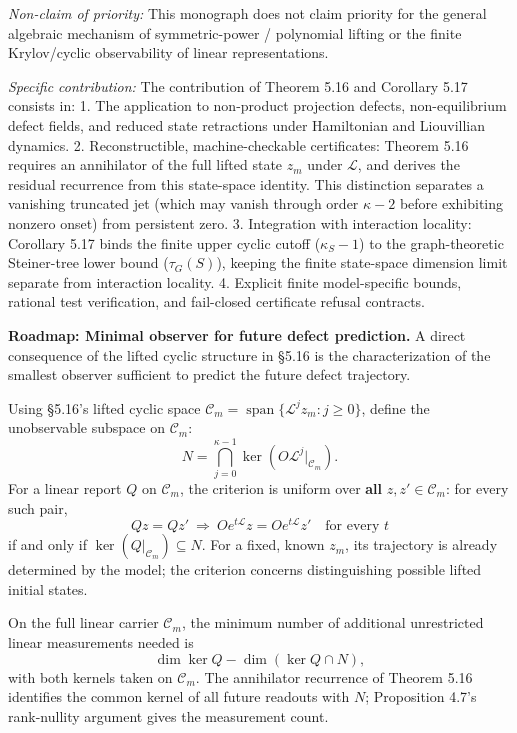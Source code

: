 \documentclass[
  11pt,
]{article}
\begin{document}
\emph{Non-claim of priority:} This monograph does not claim priority for the general
algebraic mechanism of symmetric-power / polynomial lifting or the finite
Krylov/cyclic observability of linear representations.

\emph{Specific contribution:} The contribution of Theorem 5.16 and Corollary 5.17
consists in:
1. The application to non-product projection defects, non-equilibrium defect
fields, and reduced state retractions under Hamiltonian and Liouvillian dynamics.
2. Reconstructible, machine-checkable certificates: Theorem 5.16 requires an
annihilator of the full lifted state \(z_m\) under \(\mathcal L\), and derives the
residual recurrence from this state-space identity. This distinction separates
a vanishing truncated jet (which may vanish through order \(\kappa-2\) before
exhibiting nonzero onset) from persistent zero.
3. Integration with interaction locality: Corollary 5.17 binds the finite upper
cyclic cutoff (\(\kappa_S - 1\)) to the graph-theoretic Steiner-tree lower bound
(\(\tau_G(S)\)), keeping the finite state-space dimension limit separate from
interaction locality.
4. Explicit finite model-specific bounds, rational test verification, and
fail-closed certificate refusal contracts.

\textbf{Roadmap: Minimal observer for future defect prediction.} A direct consequence
of the lifted cyclic structure in §5.16 is the characterization of the smallest
observer sufficient to predict the future defect trajectory.

Using §5.16's lifted cyclic space \(\mathcal C_m = \operatorname{span}\{\mathcal L^j z_m : j \ge 0\}\),
define the unobservable subspace on \(\mathcal C_m\):
\[
 N = \bigcap_{j=0}^{\kappa-1} \ker\left(O\mathcal L^j|_{\mathcal C_m}\right).
\]
For a linear report \(Q\) on \(\mathcal C_m\), the criterion is uniform over
\textbf{all} \(z,z'\in\mathcal C_m\): for every such pair,
\[
 Qz=Qz'\ \Longrightarrow\ Oe^{t\mathcal L}z=Oe^{t\mathcal L}z'
 \quad\text{for every }t
\]
if and only if \(\ker(Q|_{\mathcal C_m})\subseteq N\). For a fixed, known
\(z_m\), its trajectory is already determined by the model; the criterion
concerns distinguishing possible lifted initial states.

On the full linear carrier \(\mathcal C_m\), the minimum number of additional
unrestricted linear measurements needed is
\[
 \dim\ker Q-\dim(\ker Q\cap N),
\]
with both kernels taken on \(\mathcal C_m\). The annihilator recurrence of
Theorem 5.16 identifies the common kernel of all future readouts with \(N\);
Proposition 4.7's rank-nullity argument gives the measurement count.
\end{document}
